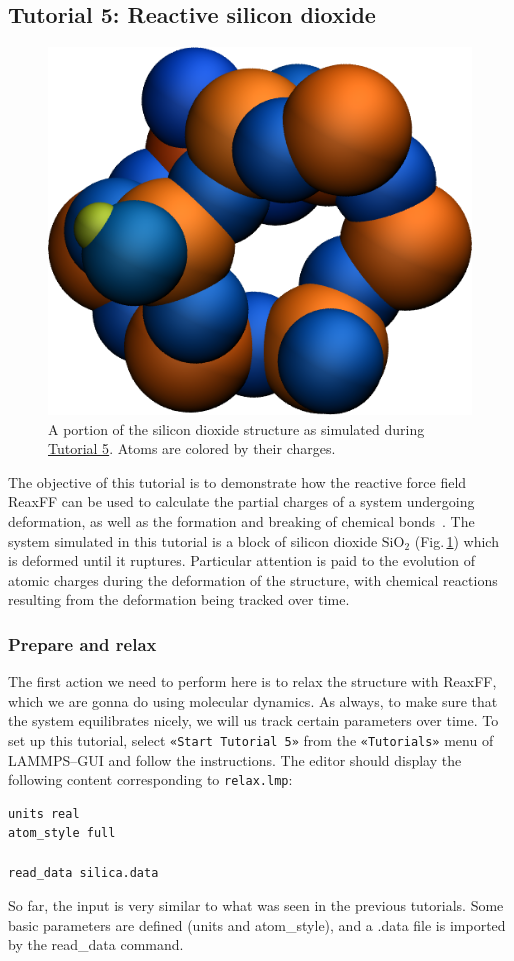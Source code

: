 \documentclass[9pt,tutorial]{livecoms}
\newcommand{\lmpcmd}[1]{\hspace{0pt}\colorbox{listing}{\textcolor{command}{\small{#1}}}\hspace{0pt}} %
\newcommand{\flecmd}[1]{\textcolor{command}{\texttt{#1}}} %
\newcommand{\guicmd}[1]{\textcolor{command}{\texttt{«#1»}}} %
\begin{document}
\subsection{Tutorial 5: Reactive silicon dioxide}
\label{reactive-silicon-dioxide-label}

\begin{figure}
\centering
\includegraphics[width=0.55\linewidth]{SIO}
\caption{A portion of the silicon dioxide structure as simulated during
\hyperref[reactive-silicon-dioxide-label]{Tutorial 5}.  Atoms are colored by their charges.}
\label{fig:SIO}
\end{figure}

The objective of this tutorial is to demonstrate how the reactive force field ReaxFF
can be used to calculate the partial charges of a system undergoing deformation, as well as
the formation and breaking of chemical bonds~\cite{van2001reaxff, zou2012investigation}.
The system simulated in this tutorial is a block of silicon dioxide $\text{SiO}_2$ (Fig.\,\ref{fig:SIO})
which is deformed until it ruptures.  Particular attention is paid to the evolution
of atomic charges during the deformation of the structure, with chemical reactions
resulting from the deformation being tracked over time.

\subsubsection{Prepare and relax}

The first action we need to perform here is to relax the structure with ReaxFF,
which we are gonna do using molecular dynamics.  As always, to make sure that the system
equilibrates nicely, we will us track certain parameters over time.  To set up this
tutorial, select \guicmd{Start Tutorial 5} from the
\guicmd{Tutorials} menu of LAMMPS--GUI and follow the instructions.
The editor should display the following content corresponding to \flecmd{relax.lmp}:
\begin{lstlisting}
units real
atom_style full

read_data silica.data

\end{lstlisting}
So far, the input is very similar to what was seen in the previous tutorials.
Some basic parameters are defined (\lmpcmd{units} and \lmpcmd{atom\_style}),
and a \lmpcmd{.data} file is imported by the \lmpcmd{read\_data} command.
\end{document}
